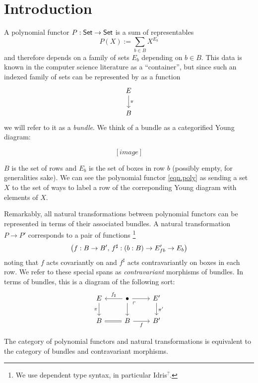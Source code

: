 
\section{Introduction}
A polynomial functor $P : \operatorname{\mathsf{{Set}}} \to \operatorname{\mathsf{{Set}}}$ is a sum of representables
\begin{equation}\label{eqn.poly}
P(X) := \sum_{b \in B} X^{E_b}
\end{equation}
and therefore depends on a family of sets $E_b$ depending on $b\in B$. This data is known
in the computer science literature as a ``container'', but since such an indexed
family of sets can be represented by as a function
\[
  \begin{tikzcd}
    E \arrow[d, "\pi"] \\
    B
  \end{tikzcd}
\]
we will refer to it as a \emph{bundle}. We think of a bundle as a categorified
Young diagram:

\[
[image]
\]

$B$ is the set of rows and $E_b$ is the set of boxes in row $b$ (possibly empty,
for generalities sake). We can see the polynomial functor \eqref{eqn.poly}
as sending a set $X$ to the set of ways to label a row of the correponding Young
diagram with elements of $X$.

Remarkably, all natural transformations between polynomial functors can be
represented in terms of their associated bundles. A natural transformation $P
\to P'$ corresponds to a pair of functions%
\footnote{We use dependent type syntax, in particular Idris$^?$.}
\[
\left( f : B \to B',\, f^{\sharp} : ({b : B}) \to E'_{fb} \to E_b \right)
\]
noting that $f$ acts covariantly on  and $f^\sharp$ acts contravariantly on
boxes in each row. We refer to these special spans as  \emph{contravariant} morphisms of bundles.
In terms of bundles, this is a diagram of the following sort:
\[
  \begin{tikzcd}
    E \arrow[d, "\pi"'] \arrow[r, leftarrow, "f_{\sharp}"] & \bullet \arrow[d] \arrow[r]
    \arrow[dr, phantom, "\ulcorner" very near start] & E' \arrow[d, "\pi'"] \\
    B \arrow[r, equals] & B \arrow[r, "f"'] & B'
  \end{tikzcd}
\]

\begin{thm}[cite]
The category of polynomial functors and natural transformations is equivalent to
the category of bundles and contravariant morphisms.
\end{thm}


